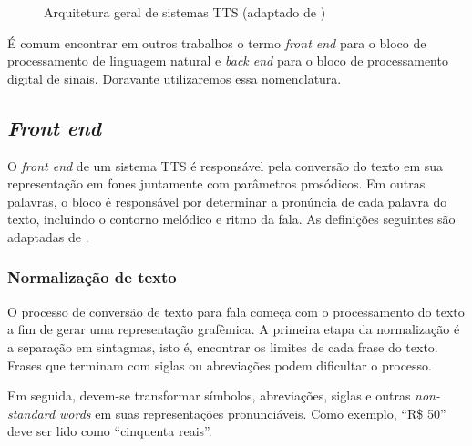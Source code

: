 \begin{figure}[!htbp]
\centering
{}
\caption{Arquitetura geral de sistemas TTS (adaptado de )}
\label{fig:tts-arch}
\end{figure}

É comum encontrar em outros trabalhos o termo \emph{front end} para o
bloco de processamento de linguagem natural e \emph{back end} para o bloco de
processamento digital de sinais. Doravante utilizaremos essa nomenclatura.

\subsection{\emph{Front end}}
O \emph{front end} de um sistema TTS é responsável pela conversão do texto em
sua representação em fones juntamente com parâmetros prosódicos. Em outras
palavras, o bloco é responsável por determinar a pronúncia de cada palavra do
texto, incluindo o contorno melódico e ritmo da fala. As definições seguintes
são adaptadas de \cite{martinjurafsky}.

\subsubsection{Normalização de texto}
O processo de conversão de texto para fala começa com o processamento do texto a
fim de gerar uma representação grafêmica. A primeira etapa da normalização é a
separação em sintagmas, isto é, encontrar os limites de cada frase do texto.
Frases que terminam com siglas ou abreviações podem dificultar o processo.

Em seguida, devem-se transformar símbolos, abreviações, siglas e outras
\emph{non-standard words} em suas representações pronunciáveis. Como exemplo,
``R\$ 50'' deve ser lido como ``cinquenta reais''.

